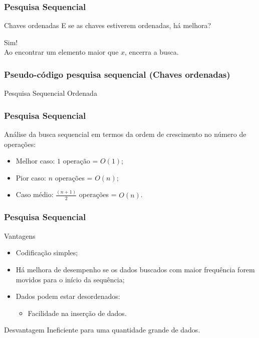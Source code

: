 \documentclass[aspectratio=169]{beamer}
\begin{document}

\begin{frame}
\frametitle{Pesquisa Sequencial}
\begin{block}{Chaves ordenadas}
 E se as chaves estiverem ordenadas, há melhora?
\end{block}
\pause
   \centering\Large{Sim!} \\
   Ao encontrar um elemento maior que $x$, encerra a busca.
\end{frame}


\begin{frame}
\frametitle{Pseudo-código pesquisa sequencial (Chaves ordenadas)}
\begin{algorithm}[H]
\caption{Pesquisa Sequencial Ordenada} 
\label{pesquisa_sequencial}
\end{algorithm}
\end{frame}


\begin{frame}
\frametitle{Pesquisa Sequencial}
Análise da busca sequencial em termos da ordem de crescimento no número de operações:
\begin{itemize}
\item Melhor caso: $1$ operação = $O(1)$;
\item Pior caso: $n$ operações = $O(n)$;
\item Caso médio: $\frac{(n+1)}{2}$ operações = $O(n)$.
\end{itemize}
\end{frame}


\begin{frame}
\frametitle{Pesquisa Sequencial}
  \begin{block}{Vantagens}
  \begin{itemize}
   \item Codificação simples;
   \item Há melhora de desempenho se os dados buscados com maior frequência forem movidos para o início da sequência;
   \item Dados podem estar desordenados:
      \begin{itemize}
	\item Facilidade na inserção de dados.
      \end{itemize}
  \end{itemize}
  \end{block}
  \begin{block}{Desvantagem}
  Ineficiente para uma quantidade grande de dados.
  \end{block}
\end{frame}
\end{document}
